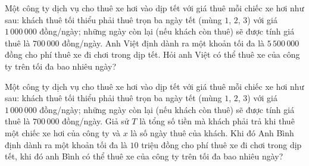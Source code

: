 
\begin{bt}%
	Một công ty dịch vụ cho thuê xe hơi vào dịp tết với giá thuê mỗi chiếc xe hơi như sau: khách thuê tối thiểu phải thuê trọn ba ngày tết (mùng $1$, $2$, $3$) với giá $1\,000\,000$ đồng/ngày; những ngày còn lại (nếu khách còn thuê) sẽ được tính giá thuê là $700\,000$ đồng/ngày. Anh Việt định dành ra một khoản tối đa là $5\,500\,000$ đồng cho phí thuê xe đi chơi trong dịp tết. Hỏi anh Việt có thể thuê xe của công ty trên  tối đa bao nhiêu ngày?
\end{bt}

\begin{bt}%
	Một công ty dịch vụ cho thuê xe hơi vào dịp tết với giá thuê mỗi chiếc xe hơi như sau: khách thuê tối thiểu  phải thuê trọn ba ngày tết (mùng $1$, $2$, $3$) với giá $1\,000\,000$ đồng/ngày; những ngày còn lại (nếu khách còn thuê) sẽ được tính giá thuê là $700\,000$ đồng/ngày. Giả sử $T$ là tổng số tiền mà khách phải trả khi thuê một chiếc xe hơi của công ty và $x$ là số ngày thuê của khách. Khi đó Anh Bình định dành ra một khoản tối đa là $10$ triệu đồng cho phí thuê xe đi chơi trong dịp tết, khi đó anh Bình có thể thuê xe của công ty trên tối đa bao nhiêu ngày?
\end{bt}

